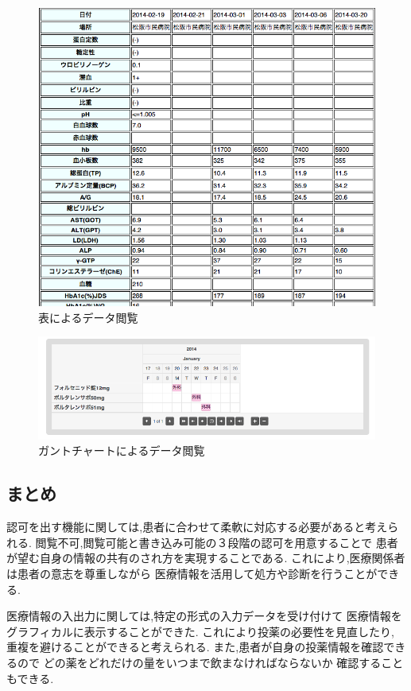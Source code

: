     \begin{figure}[htbp]
        \includegraphics[width=15cm, bb=0 0 698 621]{./gazou/DjangoTable2.png}
      \caption{表によるデータ閲覧}
      \label{DjangoTable}
    \end{figure}

    \begin{figure}[htbp]
        \includegraphics[width=15cm, bb=0 0 835 221]{./gazou/DjangoGantt2.png}
      \caption{ガントチャートによるデータ閲覧}
      \label{DjangoGantt}
    \end{figure}



\subsection{まとめ}
  認可を出す機能に関しては,患者に合わせて柔軟に対応する必要があると考えられる.
  閲覧不可,閲覧可能と書き込み可能の３段階の認可を用意することで
  患者が望む自身の情報の共有のされ方を実現することである.
  これにより,医療関係者は患者の意志を尊重しながら
  医療情報を活用して処方や診断を行うことができる.

  医療情報の入出力に関しては,特定の形式の入力データを受け付けて
  医療情報をグラフィカルに表示することができた.
  これにより投薬の必要性を見直したり,
  重複を避けることができると考えられる.
  また,患者が自身の投薬情報を確認できるので
  どの薬をどれだけの量をいつまで飲まなければならないか
  確認することもできる.
